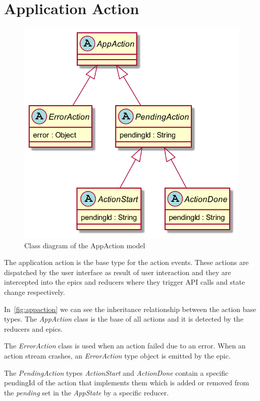\documentclass[a4paper,12pt]{report}
\begin{document}
\section{Application Action}

\begin{figure}[H]
    \centering
    \includegraphics[scale=0.45]{diagrams/class/app_action.png}
    \caption{Class diagram of the AppAction model}\label{fig:appaction}
\end{figure}

The application action is the base type for the action events. These actions
are dispatched by the user interface as result of user interaction and they are
intercepted into the epics and reducers where they trigger API calls and state
change respectively.

In~\autoref{fig:appaction} we can see the inheritance relationship between the
action base types. The \textit{AppAction} class is the base of all actions and
it is detected by the reducers and epics.

The \textit{ErrorAction} class is used when an action failed due to an error.
When an action stream crashes, an \textit{ErrorAction} type object is emitted
by the epic.

The \textit{PendingAction} types \textit{ActionStart} and \textit{ActionDone}
contain a specific pendingId of the action that implements them which is added
or removed from the \textit{pending} set in the \textit{AppState} by a specific
reducer.
\end{document}
